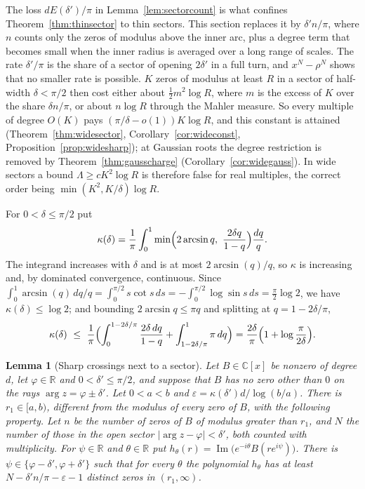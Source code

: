 \documentclass[11pt]{article}
\newtheorem{lemma}[theorem]{Lemma}
\newcommand{\R}{\mathbb R}
\begin{document}
The loss $dE(\delta')/\pi$ in Lemma~\ref{lem:sectorcount} is what confines
Theorem~\ref{thm:thinsector} to thin sectors.  This section replaces it by
$\delta'n/\pi$, where $n$ counts only the zeros of modulus above the inner
arc, plus a degree term that becomes small when the inner radius is averaged
over a long range of scales.  The rate $\delta'/\pi$ is the share of a
sector of opening $2\delta'$ in a full turn, and $x^N-\rho^N$ shows that no
smaller rate is possible.  $K$ zeros of modulus at least $R$ in a sector of
half-width $\delta<\pi/2$ then cost either about $\frac12m^2\log R$, where
$m$ is the excess of $K$ over the share $\delta n/\pi$, or about $n\log R$
through the Mahler measure.  So every multiple of degree $O(K)$ pays
$(\pi/\delta-o(1))K\log R$, and this constant is attained
(Theorem~\ref{thm:widesector}, Corollary~\ref{cor:wideconst},
Proposition~\ref{prop:widesharp}); at Gaussian roots the degree restriction
is removed by Theorem~\ref{thm:gausscharge} (Corollary~\ref{cor:widegauss}).
In wide sectors a bound $\Lambda\ge cK^2\log R$ is therefore false for real
multiples, the correct order being $\min(K^2,K/\delta)\log R$.

For $0<\delta\le\pi/2$ put
\[
  \kappa(\delta)=\frac1\pi\int_0^1\min\Bigl(2\arcsin q,\ \frac{2\delta q}{1-q}\Bigr)\frac{dq}q .
\]
The integrand increases with $\delta$ and is at most $2\arcsin(q)/q$, so
$\kappa$ is increasing and, by dominated convergence, continuous.  Since
$\int_0^1\arcsin(q)\,dq/q=\int_0^{\pi/2}s\cot s\,ds=-\int_0^{\pi/2}\log\sin s\,ds
=\frac\pi2\log2$, we have $\kappa(\delta)\le\log2$; and bounding
$2\arcsin q\le\pi q$ and splitting at $q=1-2\delta/\pi$,
\[
  \kappa(\delta)\ \le\ \frac1\pi\Bigl(\int_0^{1-2\delta/\pi}\frac{2\delta\,dq}{1-q}
  +\int_{1-2\delta/\pi}^1\pi\,dq\Bigr)
  =\frac{2\delta}\pi\Bigl(1+\log\frac\pi{2\delta}\Bigr).
\]

\begin{lemma}[Sharp crossings next to a sector]\label{lem:sharpcross}
Let $B\in\mathbb C[x]$ be nonzero of degree $d$, let $\varphi\in\R$ and
$0<\delta'\le\pi/2$, and suppose that $B$ has no zero other than $0$ on the
rays $\arg z=\varphi\pm\delta'$.  Let $0<a<b$ and
$\varepsilon=\kappa(\delta')d/\log(b/a)$.  There is $r_1\in[a,b)$, different
from the modulus of every zero of $B$, with the following property.  Let $n$
be the number of zeros of $B$ of modulus greater than $r_1$, and $N$ the
number of those in the open sector $|\arg z-\varphi|<\delta'$, both counted
with multiplicity.  For $\psi\in\R$ and $\theta\in\R$ put
$h_\theta(r)=\operatorname{Im}\bigl(e^{-i\theta}B(re^{i\psi})\bigr)$.
There is $\psi\in\{\varphi-\delta',\varphi+\delta'\}$ such that for
every $\theta$ the polynomial $h_\theta$ has at least
$N-\delta'n/\pi-\varepsilon-1$ distinct zeros in $(r_1,\infty)$.
\end{lemma}
\end{document}
